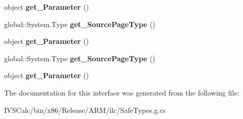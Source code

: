 \begin{DoxyCompactItemize}
\mbox{\label{interface_windows_1_1_u_i_1_1_xaml_1_1_navigation_1_1_i_page_stack_entry_a4287be3f3110545aaaa19a636c648fd9}} 
object {\bfseries get\+\_\+\+Parameter} ()
\item 
\mbox{\label{interface_windows_1_1_u_i_1_1_xaml_1_1_navigation_1_1_i_page_stack_entry_a76a5c7e17777c4cf382bb0f3a3adaa44}} 
global\+::\+System.\+Type {\bfseries get\+\_\+\+Source\+Page\+Type} ()
\item 
\mbox{\label{interface_windows_1_1_u_i_1_1_xaml_1_1_navigation_1_1_i_page_stack_entry_a4287be3f3110545aaaa19a636c648fd9}} 
object {\bfseries get\+\_\+\+Parameter} ()
\item 
\mbox{\label{interface_windows_1_1_u_i_1_1_xaml_1_1_navigation_1_1_i_page_stack_entry_a76a5c7e17777c4cf382bb0f3a3adaa44}} 
global\+::\+System.\+Type {\bfseries get\+\_\+\+Source\+Page\+Type} ()
\item 
\mbox{\label{interface_windows_1_1_u_i_1_1_xaml_1_1_navigation_1_1_i_page_stack_entry_a4287be3f3110545aaaa19a636c648fd9}} 
object {\bfseries get\+\_\+\+Parameter} ()
\end{DoxyCompactItemize}


The documentation for this interface was generated from the following file\+:\begin{DoxyCompactItemize}
\item 
I\+V\+S\+Calc/bin/x86/\+Release/\+A\+R\+M/ilc/Safe\+Types.\+g.\+cs\end{DoxyCompactItemize}
